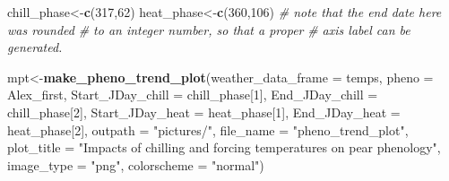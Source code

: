 \documentclass[
]{book}
\newenvironment{Shaded}{\begin{snugshade}}{\end{snugshade}}
\newcommand{\CommentTok}[1]{\textcolor[rgb]{0.56,0.35,0.01}{\textit{#1}}}
\newcommand{\DataTypeTok}[1]{\textcolor[rgb]{0.13,0.29,0.53}{#1}}
\newcommand{\DecValTok}[1]{\textcolor[rgb]{0.00,0.00,0.81}{#1}}
\newcommand{\KeywordTok}[1]{\textcolor[rgb]{0.13,0.29,0.53}{\textbf{#1}}}
\newcommand{\NormalTok}[1]{#1}
\newcommand{\StringTok}[1]{\textcolor[rgb]{0.31,0.60,0.02}{#1}}
\begin{document}
\begin{Shaded}
\begin{Highlighting}[]
\NormalTok{chill_phase<-}\KeywordTok{c}\NormalTok{(}\DecValTok{317}\NormalTok{,}\DecValTok{62}\NormalTok{)}
\NormalTok{heat_phase<-}\KeywordTok{c}\NormalTok{(}\DecValTok{360}\NormalTok{,}\DecValTok{106}\NormalTok{) }\CommentTok{# note that the end date here was rounded}
                       \CommentTok{# to an integer number, so that a proper }
                       \CommentTok{# axis label can be generated.}


\NormalTok{mpt<-}\KeywordTok{make_pheno_trend_plot}\NormalTok{(}\DataTypeTok{weather_data_frame =}\NormalTok{ temps,}
                           \DataTypeTok{pheno =}\NormalTok{ Alex_first,}
                           \DataTypeTok{Start_JDay_chill =}\NormalTok{ chill_phase[}\DecValTok{1}\NormalTok{], }
                           \DataTypeTok{End_JDay_chill =}\NormalTok{ chill_phase[}\DecValTok{2}\NormalTok{],}
                           \DataTypeTok{Start_JDay_heat =}\NormalTok{ heat_phase[}\DecValTok{1}\NormalTok{],}
                           \DataTypeTok{End_JDay_heat =}\NormalTok{ heat_phase[}\DecValTok{2}\NormalTok{],}
                           \DataTypeTok{outpath =} \StringTok{"pictures/"}\NormalTok{,}
                           \DataTypeTok{file_name =} \StringTok{"pheno_trend_plot"}\NormalTok{,}
                           \DataTypeTok{plot_title =}
  \StringTok{"Impacts of chilling and forcing temperatures on pear phenology"}\NormalTok{,}
                           \DataTypeTok{image_type =} \StringTok{"png"}\NormalTok{, }
                           \DataTypeTok{colorscheme =} \StringTok{"normal"}\NormalTok{)}
\end{Highlighting}
\end{Shaded}
\end{document}
